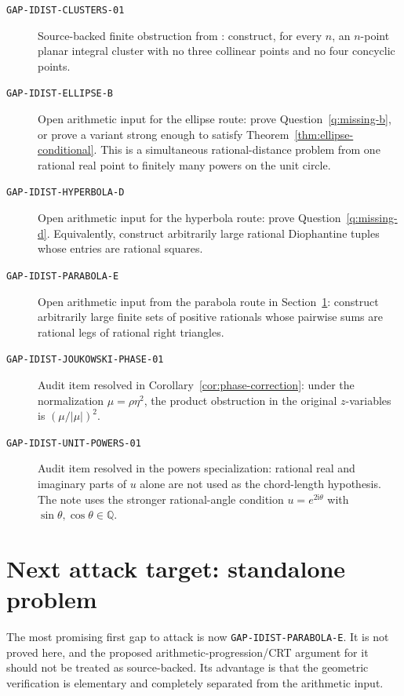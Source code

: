 \documentclass[11pt]{article}
\theoremstyle{definition}
\theoremstyle{remark}
\newcommand{\Q}{\mathbb{Q}}
\newcommand{\ii}{\mathrm{i}}
\newcommand{\abs}[1]{\left|#1\right|}
\begin{document}
\begin{description}
\item[\texttt{GAP-IDIST-CLUSTERS-01}]
Source-backed finite obstruction from
: construct, for every
\(n\), an \(n\)-point planar integral cluster with no three collinear points and
no four concyclic points.

\item[\texttt{GAP-IDIST-ELLIPSE-B}]
Open arithmetic input for the ellipse route: prove Question~\ref{q:missing-b},
or prove a variant strong enough to satisfy Theorem~\ref{thm:ellipse-conditional}.
This is a simultaneous rational-distance problem from one rational real point
to finitely many powers on the unit circle.

\item[\texttt{GAP-IDIST-HYPERBOLA-D}]
Open arithmetic input for the hyperbola route: prove Question~\ref{q:missing-d}.
Equivalently, construct arbitrarily large rational Diophantine tuples whose
entries are rational squares.

\item[\texttt{GAP-IDIST-PARABOLA-E}]
Open arithmetic input from the parabola route in Section~\ref{sec:next-targets}:
construct arbitrarily large finite sets of positive rationals whose pairwise
sums are rational legs of rational right triangles.

\item[\texttt{GAP-IDIST-JOUKOWSKI-PHASE-01}]
Audit item resolved in Corollary~\ref{cor:phase-correction}: under the
normalization \(\mu=\rho\eta^2\), the product obstruction in the original
\(z\)-variables is \({(\mu/\abs\mu)}^2\).

\item[\texttt{GAP-IDIST-UNIT-POWERS-01}]
Audit item resolved in the powers specialization: rational real and imaginary
parts of \(u\) alone are not used as the chord-length hypothesis.  The note uses
the stronger rational-angle condition \(u=e^{2\ii\theta}\) with
\(\sin\theta,\cos\theta\in\Q\).
\end{description}

\section{Next attack target: standalone problem}\label{sec:next-targets}

The most promising first gap to attack is now \texttt{GAP-IDIST-PARABOLA-E}.
It is not proved here, and the proposed arithmetic-progression/CRT argument for
it should not be treated as source-backed.  Its advantage is that the geometric
verification is elementary and completely separated from the arithmetic input.
\end{document}
